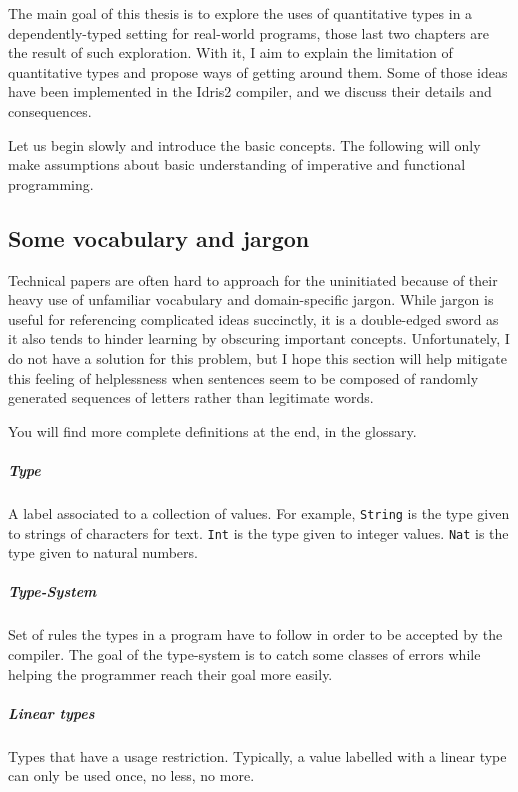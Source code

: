 \documentclass[
]{article}
\begin{document}
The main goal of this thesis is to explore the uses of quantitative
types in a dependently-typed setting for real-world programs, those last
two chapters are the result of such exploration. With it, I aim to
explain the limitation of quantitative types and propose ways of getting
around them. Some of those ideas have been implemented in the Idris2
compiler, and we discuss their details and consequences.

Let us begin slowly and introduce the basic concepts. The following will
only make assumptions about basic understanding of imperative and
functional programming.

\hypertarget{some-vocabulary-and-jargon}{%
\subsection{Some vocabulary and
jargon}\label{some-vocabulary-and-jargon}}

Technical papers are often hard to approach for the uninitiated because
of their heavy use of unfamiliar vocabulary and domain-specific jargon.
While jargon is useful for referencing complicated ideas succinctly, it
is a double-edged sword as it also tends to hinder learning by obscuring
important concepts. Unfortunately, I do not have a solution for this
problem, but I hope this section will help mitigate this feeling of
helplessness when sentences seem to be composed of randomly generated
sequences of letters rather than legitimate words.

You will find more complete definitions at the end, in the glossary.

\hypertarget{type}{%
\subparagraph{Type}\label{type}}

A label associated to a collection of values. For example,
\texttt{String} is the type given to strings of characters for text.
\texttt{Int} is the type given to integer values. \texttt{Nat} is the
type given to natural numbers.

\hypertarget{type-system}{%
\subparagraph{Type-System}\label{type-system}}

Set of rules the types in a program have to follow in order to be
accepted by the compiler. The goal of the type-system is to catch some
classes of errors while helping the programmer reach their goal more
easily.

\hypertarget{linear-types}{%
\subparagraph{Linear types}\label{linear-types}}

Types that have a usage restriction. Typically, a value labelled with a
linear type can only be used once, no less, no more.
\end{document}
